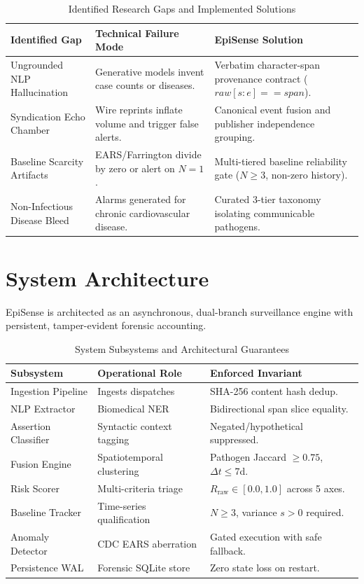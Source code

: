 \documentclass[conference]{IEEEtran}
\begin{document}
\begin{table}[htbp]
\caption{Identified Research Gaps and Implemented Solutions}
\label{tab:gaps}
\begin{center}
\begin{tabular}{p{2.2cm}p{2.6cm}p{2.8cm}}
\toprule
\textbf{Identified Gap} & \textbf{Technical Failure Mode} & \textbf{EpiSense Solution} \\
\midrule
Ungrounded NLP Hallucination & Generative models invent case counts or diseases. & Verbatim character-span provenance contract ($raw[s:e] == span$). \\
\addlinespace
Syndication Echo Chamber & Wire reprints inflate volume and trigger false alerts. & Canonical event fusion and publisher independence grouping. \\
\addlinespace
Baseline Scarcity Artifacts & EARS/Farrington divide by zero or alert on $N=1$. & Multi-tiered baseline reliability gate ($N \ge 3$, non-zero history). \\
\addlinespace
Non-Infectious Disease Bleed & Alarms generated for chronic cardiovascular disease. & Curated 3-tier taxonomy isolating communicable pathogens. \\
\bottomrule
\end{tabular}
\end{center}
\end{table}

\section{System Architecture}
EpiSense is architected as an asynchronous, dual-branch surveillance engine with persistent, tamper-evident forensic accounting.

\begin{table}[htbp]
\caption{System Subsystems and Architectural Guarantees}
\label{tab:subsystems}
\begin{center}
\begin{tabular}{p{2.2cm}p{2.6cm}p{2.8cm}}
\toprule
\textbf{Subsystem} & \textbf{Operational Role} & \textbf{Enforced Invariant} \\
\midrule
Ingestion Pipeline & Ingests dispatches & SHA-256 content hash dedup. \\
NLP Extractor & Biomedical NER & Bidirectional span slice equality. \\
Assertion Classifier & Syntactic context tagging & Negated/hypothetical suppressed. \\
Fusion Engine & Spatiotemporal clustering & Pathogen Jaccard $\ge 0.75$, $\Delta t \le 7$d. \\
Risk Scorer & Multi-criteria triage & $R_{\text{raw}} \in [0.0, 1.0]$ across 5 axes. \\
Baseline Tracker & Time-series qualification & $N \ge 3$, variance $s > 0$ required. \\
Anomaly Detector & CDC EARS aberration & Gated execution with safe fallback. \\
Persistence WAL & Forensic SQLite store & Zero state loss on restart. \\
\bottomrule
\end{tabular}
\end{center}
\end{table}
\end{document}
